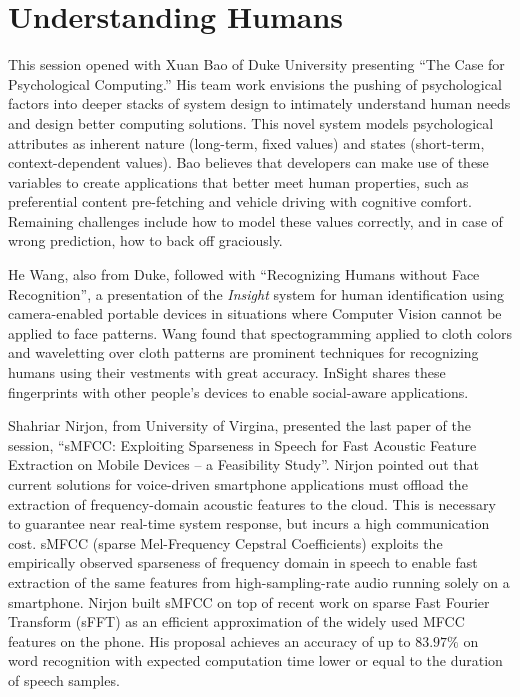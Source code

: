 \section{Understanding Humans}
\label{sec:session3_humans}

This session opened with Xuan Bao of Duke University presenting ``The
Case for Psychological Computing.'' His team work envisions the pushing
of psychological factors into deeper stacks of system design to
intimately understand human needs and design better computing solutions.
This novel system models psychological attributes as inherent nature
(long-term, fixed values) and states (short-term, context-dependent
values).  Bao believes that developers can make use of these variables
to create applications that better meet human properties, such as
preferential content pre-fetching and vehicle driving with cognitive
comfort. Remaining challenges include how to model these values
correctly, and in case of wrong prediction, how to back off graciously.

He Wang, also from Duke, followed with ``Recognizing Humans without Face
Recognition'', a presentation of the \emph{Insight} system for human
identification using camera-enabled portable devices in situations where
Computer Vision cannot be applied to face patterns. Wang found that
spectogramming applied to cloth colors and waveletting over cloth
patterns are prominent techniques for recognizing humans using their
vestments with great accuracy. InSight shares these fingerprints with
other people's devices to enable social-aware applications.

Shahriar Nirjon, from University of Virgina, presented the last paper of
the session, ``sMFCC: Exploiting Sparseness in Speech for Fast Acoustic
Feature Extraction on Mobile Devices -- a Feasibility Study''. Nirjon
pointed out that current solutions for voice-driven smartphone
applications must offload the extraction of frequency-domain acoustic
features to the cloud. This is necessary to guarantee near real-time
system response, but incurs a high communication cost. sMFCC (sparse
Mel-Frequency Cepstral Coefficients) exploits the empirically observed
sparseness of frequency domain in speech to enable fast extraction of
the same features from high-sampling-rate audio running solely on a
smartphone. Nirjon built sMFCC on top of recent work on sparse Fast
Fourier Transform (sFFT) as an efficient approximation of the widely
used MFCC features on the phone. His proposal achieves an accuracy of up
to $83.97\%$ on word recognition with expected computation time lower or
equal to the duration of speech samples.

